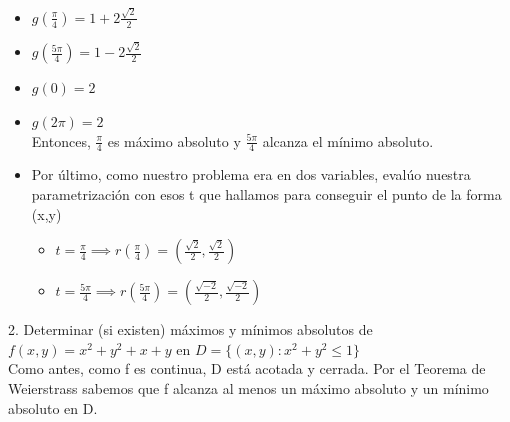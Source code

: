 \documentclass[10pt,a4paper]{article}
\begin{document}
\begin{itemize}
\begin{itemize}
        \item $g(\frac{\pi}{4}) = 1 + 2\frac{\sqrt{2}}{2}$
        \item $g(\frac{5\pi}{4}) = 1 - 2\frac{\sqrt{2}}{2}$
        \item $g(0) = 2$
        \item $g(2\pi) = 2$ \\
        Entonces, $\frac{\pi}{4}$ es máximo absoluto y $\frac{5\pi}{4}$ alcanza el mínimo absoluto.
        \item Por último, como nuestro problema era en dos variables, evalúo nuestra parametrización con esos t que hallamos para conseguir el punto de la forma (x,y)
        \begin{itemize}
        \item $ t = \frac{\pi}{4} \implies r(\frac{\pi}{4}) = (\frac{\sqrt{2}}{2}, \frac{\sqrt{2}}{2})$
        \item $ t = \frac{5\pi}{4} \implies r(\frac{5\pi}{4}) = (\frac{\sqrt{-2}}{2}, \frac{\sqrt{-2}}{2})$
    \end{itemize}
    
    \end{itemize}
\end{itemize}
2. Determinar (si existen) máximos y mínimos absolutos de $f(x,y) = x^{2} + y^{2} + x + y$ en $D = \{(x,y): x^{2} + y^{2} \le 1 \}$ \\
Como antes, como f es continua, D está acotada y cerrada. Por el Teorema de Weierstrass sabemos que f alcanza al menos un máximo absoluto y un mínimo absoluto en D.
\end{document}
